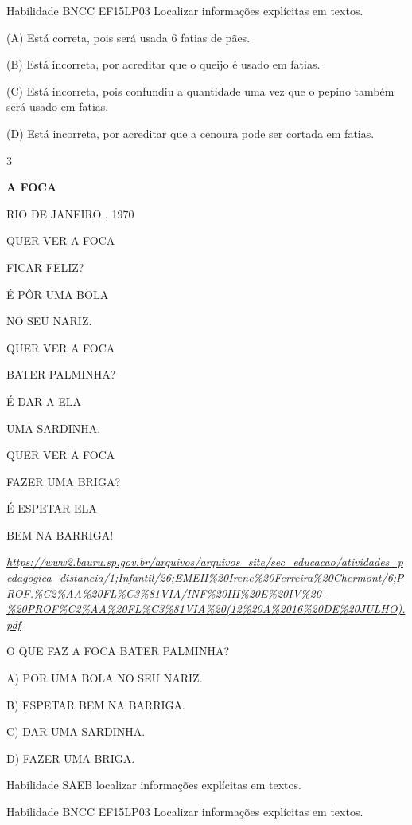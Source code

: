 \begin{escola}
Habilidade BNCC EF15LP03 Localizar informações explícitas em textos.

(A) Está correta, pois será usada 6 fatias de pães.

(B) Está incorreta, por acreditar que o queijo é usado em fatias.

(C) Está incorreta, pois confundiu a quantidade uma vez que o pepino
também será usado em fatias.

(D) Está incorreta, por acreditar que a cenoura pode ser cortada em
fatias.

\num{3}

\textbf{A FOCA}

RIO DE JANEIRO , 1970

QUER VER A FOCA

FICAR FELIZ?

É PÔR UMA BOLA

NO SEU NARIZ.

QUER VER A FOCA

BATER PALMINHA?

É DAR A ELA

UMA SARDINHA.

QUER VER A FOCA

FAZER UMA BRIGA?

É ESPETAR ELA

BEM NA BARRIGA!

\href{https://www2.bauru.sp.gov.br/arquivos/arquivos_site/sec_educacao/atividades_pedagogica_distancia/1;Infantil/26;EMEII\%20Irene\%20Ferreira\%20Chermont/6;PROF.\%C2\%AA\%20FL\%C3\%81VIA/INF\%20III\%20E\%20IV\%20-\%20PROF\%C2\%AA\%20FL\%C3\%81VIA\%20(12\%20A\%2016\%20DE\%20JULHO).pdf}{\emph{https://www2.bauru.sp.gov.br/arquivos/arquivos\_site/sec\_educacao/atividades\_pedagogica\_distancia/1;Infantil/26;EMEII\%20Irene\%20Ferreira\%20Chermont/6;PROF.\%C2\%AA\%20FL\%C3\%81VIA/INF\%20III\%20E\%20IV\%20-\%20PROF\%C2\%AA\%20FL\%C3\%81VIA\%20(12\%20A\%2016\%20DE\%20JULHO).pdf}}

O QUE FAZ A FOCA BATER PALMINHA?

A) POR UMA BOLA NO SEU NARIZ.

B) ESPETAR BEM NA BARRIGA.

C) DAR UMA SARDINHA.

D) FAZER UMA BRIGA.

\protect\hypertarget{_heading=h.3j2qqm3}{}{}Habilidade SAEB localizar
informações explícitas em textos.

Habilidade BNCC EF15LP03 Localizar informações explícitas em textos.


\end{escola}
